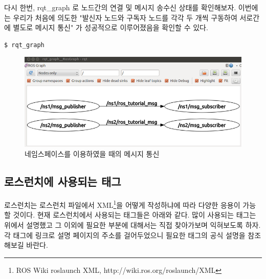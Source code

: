 다시 한번, rqt\_graph 로 노드간의 연결 및 메시지 송수신 상태를 확인해보자. 이번에는 우리가 처음에 의도한 "발신자 노드와 구독자 노드를 각각 두 개씩 구동하여 서로간에 별도로 메시지 통신" 가 성공적으로 이루어졌음을 확인할 수 있다.

\begin{lstlisting}[language=ROS]
$ rqt_graph
\end{lstlisting}

\begin{figure}[h]
\centering\includegraphics[width=0.9\columnwidth]{pictures/chapter7/rqt_graph_oroca_ros_tutorials_union2.png}
\caption{네임스페이스를 이용하였을 때의 메시지 통신}
\end{figure}

\subsection{로스런치에 사용되는 태그}

로스런치는 로스런치 파일에서 XML\footnote{ROS Wiki roslaunch XML,  http://wiki.ros.org/roslaunch/XML}을 어떻게 작성하냐에 따라 다양한 응용이 가능할 것이다. 현재 로스런치에서 사용되는 태그들은 아래와 같다. 많이 사용되는 태그는 위에서 설명했고 그 이외에 필요한 부분에 대해서는 직접 찾아가보며 익혀보도록 하자. 각 태그에 링크로 설명 페이지의 주소를 걸어두었으니 필요한 태그의 공식 설명을 참조해보길 바란다.

